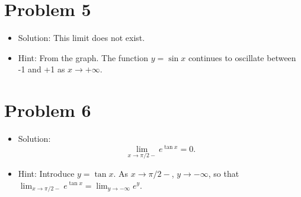 \documentclass{amsart}
\begin{document}
\section*{Problem 5}

\begin{itemize}
\item Solution: This limit does not exist.
\item Hint: From the graph. The function $y = \sin x$ continues to oscillate between -1 and +1 as $x \to +\infty$.
\end{itemize}


\section*{Problem 6}

\begin{itemize}
\item Solution:
  \[
    \lim_{x \to \pi/2-} e^{\tan x} = 0.
  \]
\item Hint: Introduce $y = \tan x$. As $x \to \pi/2-$, $y \to -\infty$, so that $\displaystyle \lim_{x \to \pi/2-} e^{\tan x} = \lim_{y \to -\infty} e^y$.
\end{itemize}
\end{document}
